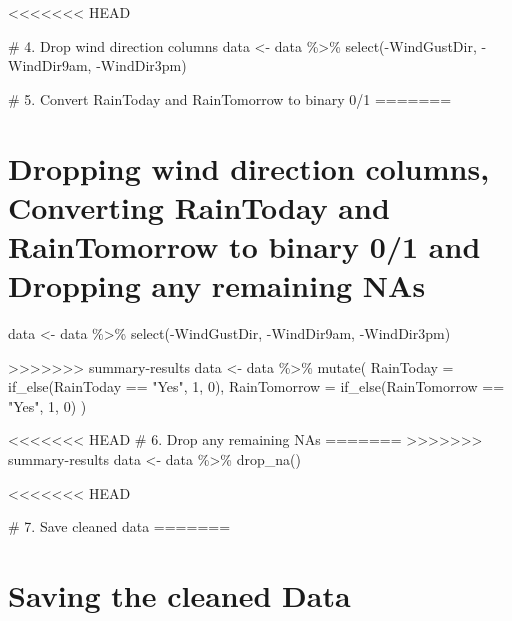 \documentclass[
  letterpaper,
  DIV=11,
  numbers=noendperiod]{scrartcl}
\newenvironment{Shaded}{\begin{snugshade}}{\end{snugshade}}
\newcommand{\AttributeTok}[1]{\textcolor[rgb]{0.40,0.45,0.13}{#1}}
\newcommand{\CommentTok}[1]{\textcolor[rgb]{0.37,0.37,0.37}{#1}}
\newcommand{\DecValTok}[1]{\textcolor[rgb]{0.68,0.00,0.00}{#1}}
\newcommand{\FunctionTok}[1]{\textcolor[rgb]{0.28,0.35,0.67}{#1}}
\newcommand{\NormalTok}[1]{\textcolor[rgb]{0.00,0.23,0.31}{#1}}
\newcommand{\OtherTok}[1]{\textcolor[rgb]{0.00,0.23,0.31}{#1}}
\newcommand{\SpecialCharTok}[1]{\textcolor[rgb]{0.37,0.37,0.37}{#1}}
\newcommand{\StringTok}[1]{\textcolor[rgb]{0.13,0.47,0.30}{#1}}
\begin{document}
\begin{Shaded}
\begin{Highlighting}[]
<<<<<<< HEAD
\begin{Shaded}
\begin{Highlighting}[]
\CommentTok{\# 4. Drop wind direction columns}
\NormalTok{data }\OtherTok{\textless{}{-}}\NormalTok{ data }\SpecialCharTok{\%\textgreater{}\%}
  \FunctionTok{select}\NormalTok{(}\SpecialCharTok{{-}}\NormalTok{WindGustDir, }\SpecialCharTok{{-}}\NormalTok{WindDir9am, }\SpecialCharTok{{-}}\NormalTok{WindDir3pm)}

\CommentTok{\# 5. Convert RainToday and RainTomorrow to binary 0/1}
=======
\section{Dropping wind direction columns, Converting RainToday and
RainTomorrow to binary 0/1 and Dropping any remaining
NAs}\label{dropping-wind-direction-columns-converting-raintoday-and-raintomorrow-to-binary-01-and-dropping-any-remaining-nas}

\begin{Shaded}
\begin{Highlighting}[]
\NormalTok{data }\OtherTok{\textless{}{-}}\NormalTok{ data }\SpecialCharTok{\%\textgreater{}\%}
  \FunctionTok{select}\NormalTok{(}\SpecialCharTok{{-}}\NormalTok{WindGustDir, }\SpecialCharTok{{-}}\NormalTok{WindDir9am, }\SpecialCharTok{{-}}\NormalTok{WindDir3pm)}

>>>>>>> summary-results
\NormalTok{data }\OtherTok{\textless{}{-}}\NormalTok{ data }\SpecialCharTok{\%\textgreater{}\%}
  \FunctionTok{mutate}\NormalTok{(}
    \AttributeTok{RainToday =} \FunctionTok{if\_else}\NormalTok{(RainToday }\SpecialCharTok{==} \StringTok{"Yes"}\NormalTok{, }\DecValTok{1}\NormalTok{, }\DecValTok{0}\NormalTok{),}
    \AttributeTok{RainTomorrow =} \FunctionTok{if\_else}\NormalTok{(RainTomorrow }\SpecialCharTok{==} \StringTok{"Yes"}\NormalTok{, }\DecValTok{1}\NormalTok{, }\DecValTok{0}\NormalTok{)}
\NormalTok{  )}

<<<<<<< HEAD
\CommentTok{\# 6. Drop any remaining NAs}
=======
>>>>>>> summary-results
\NormalTok{data }\OtherTok{\textless{}{-}}\NormalTok{ data }\SpecialCharTok{\%\textgreater{}\%} \FunctionTok{drop\_na}\NormalTok{()}
\end{Highlighting}
\end{Shaded}

<<<<<<< HEAD
\begin{Shaded}
\begin{Highlighting}[]
\CommentTok{\# 7. Save cleaned data}
=======
\section{Saving the cleaned Data}\label{saving-the-cleaned-data}


\end{Highlighting}
\end{Shaded}
\end{Highlighting}
\end{Shaded}
\end{Highlighting}
\end{Shaded}
\end{document}
